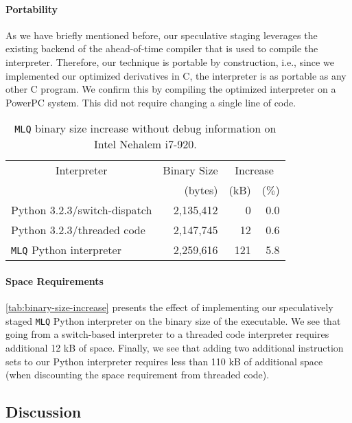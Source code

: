 \documentclass[preprint,10pt]{popl14conf}
\newcommand{\mlq}{\texttt{MLQ}}
\begin{document}
\paragraph{Portability}
As we have briefly mentioned before, our speculative staging leverages the existing backend of the
ahead-of-time compiler that is used to compile the interpreter.
Therefore, our technique is portable by construction, i.e., since we implemented our optimized
derivatives in C, the interpreter is as portable as any other C program.
We confirm this by compiling the optimized interpreter on a PowerPC system.
This did not require changing a single line of code.

\begin{table}[t!]
  \centering
    \begin{tabular}{|l|r|r|r|}
      \hline
      \multicolumn{1}{|c|}{Interpreter} & Binary Size & \multicolumn{2}{c|}{Increase} \\
      \cline{3-4}
      & (bytes)     & (kB) & ($\%$)                 \\
      \hline
      \hline
      Python 3.2.3/switch-dispatch      & 2,135,412   & 0    & 0.0                    \\
      Python 3.2.3/threaded code        & 2,147,745   & 12   & 0.6                    \\
      \mlq{} Python interpreter         & 2,259,616   & 121  & 5.8                    \\
      \hline
    \end{tabular}
    \caption{\mlq{} binary size increase without debug information on Intel Nehalem i7-920.\label{tab:binary-size-increase}}
\end{table}

\paragraph{Space Requirements}\autoref{tab:binary-size-increase} presents the effect of implementing
our speculatively staged \mlq{} Python interpreter on the binary size of the executable.
We see that going from a switch-based interpreter to a threaded code interpreter requires additional
12 kB of space.
Finally, we see that adding two additional instruction sets to our Python interpreter requires less
than 110 kB of additional space (when discounting the space requirement from threaded code).


\subsection{Discussion}\label{ss:discussion}
\end{document}
